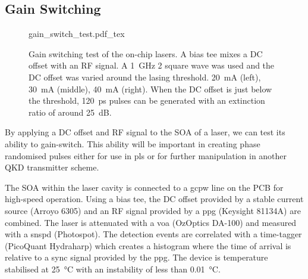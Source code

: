 \subsection{Gain Switching}

\begin{figure}[tp]
	\centering
	\small	
	\def\svgwidth{\textwidth} 
	{gain_switch_test.pdf_tex}
	\caption[Gain switching test of the HHI on-chip lasers]{Gain switching test of the on-chip lasers. A bias tee mixes a DC offset with an RF signal. A \SI{1}{GHz} \SI{2}{\Vpp} square wave was used and the DC offset was varied around the lasing threshold. \SI{20}{mA} (left), \SI{30}{\mA} (middle), \SI{40}{\mA} (right). When the DC offset is just below the threshold, \SI{120}{ps} pulses can be generated with an extinction ratio of around \SI{25}{dB}.}
	\label{fig:gain_switch_test}
\end{figure}

By applying a DC offset and RF signal to the \ac{SOA} of a laser, we can test its ability to gain-switch. This ability will be important in creating phase randomised pulses either for use in \ac{pls} or for further manipulation in another \ac{QKD} transmitter scheme.


The \ac{SOA} within the laser cavity is connected to a \ac{gcpw} line on the PCB for high-speed operation. Using a bias tee, the DC offset provided by a stable current source (Arroyo 6305) and an RF signal provided by a \ac{ppg} (Keysight 81134A) are combined. The laser is attenuated with a \ac{voa} (OzOptics DA-100) and measured with a \ac{snspd} (Photospot). The detection events are correlated with a time-tagger (PicoQuant Hydraharp) which creates a histogram where the time of arrival is relative to a sync signal provided by the \ac{ppg}. The device is temperature stabilised at \SI{25}{\celsius} with an instability of less than \SI{0.01}{\celsius}.



